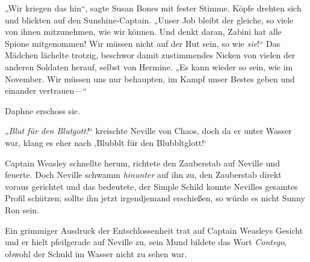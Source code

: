 „Wir kriegen das hin“, sagte Susan Bones mit fester Stimme. Köpfe drehten sich und blickten auf den Sunshine-Captain. „Unser Job bleibt der gleiche, so viele von ihnen mitzunehmen, wie wir können. Und denkt daran, Zabini hat alle Spione mitgenommen! Wir müssen nicht auf der Hut sein, so wie \emph{sie}!“ Das Mädchen lächelte trotzig, beschwor damit zustimmendes Nicken von vielen der anderen Soldaten herauf, selbst von Hermine. „Es kann wieder so sein, wie im November. Wir müssen uns nur behaupten, im Kampf unser Bestes geben und einander vertrauen—“

Daphne erschoss sie.

\later

„\emph{Blut für den Blutgott!}“ kreischte Neville von Chaos, doch da er unter Wasser war, klang es eher nach ‚Blubblt für den Blubbltglott!‘

Captain Weasley schnellte herum, richtete den Zauberstab auf Neville und feuerte. Doch Neville schwamm \emph{hinunter} auf ihn zu, den Zauberstab direkt voraus gerichtet und das bedeutete, der Simple Schild konnte Nevilles gesamtes Profil schützen; sollte ihn jetzt irgendjemand erschießen, so würde es nicht Sunny Ron sein.

Ein grimmiger Ausdruck der Entschlossenheit trat auf Captain Weasleys Gesicht und er hielt pfeilgerade auf Neville zu, sein Mund bildete das Wort \emph{Contego}, obwohl der Schuld im Wasser nicht zu sehen war.

